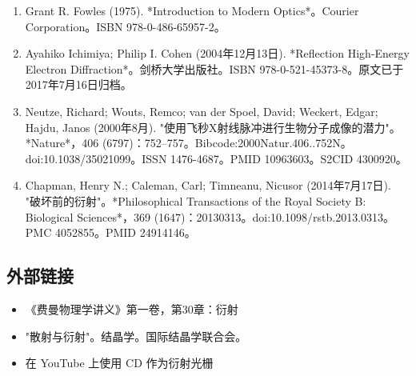 \begin{enumerate}
\item Grant R. Fowles (1975). *Introduction to Modern Optics*。Courier Corporation。ISBN 978-0-486-65957-2。
\item Ayahiko Ichimiya; Philip I. Cohen (2004年12月13日). *Reflection High-Energy Electron Diffraction*。剑桥大学出版社。ISBN 978-0-521-45373-8。原文已于2017年7月16日归档。
\item Neutze, Richard; Wouts, Remco; van der Spoel, David; Weckert, Edgar; Hajdu, Janos (2000年8月). "使用飞秒X射线脉冲进行生物分子成像的潜力"。*Nature*，406 (6797)：752–757。Bibcode:2000Natur.406..752N。doi:10.1038/35021099。ISSN 1476-4687。PMID 10963603。S2CID 4300920。
\item Chapman, Henry N.; Caleman, Carl; Timneanu, Nicusor (2014年7月17日). "破坏前的衍射"。*Philosophical Transactions of the Royal Society B: Biological Sciences*，369 (1647)：20130313。doi:10.1098/rstb.2013.0313。PMC 4052855。PMID 24914146。
\end{enumerate}
\subsection{外部链接}
\begin{itemize}
\item 《费曼物理学讲义》第一卷，第30章：衍射
\item "散射与衍射"。结晶学。国际结晶学联合会。
\item 在 YouTube 上使用 CD 作为衍射光栅
\end{itemize}
